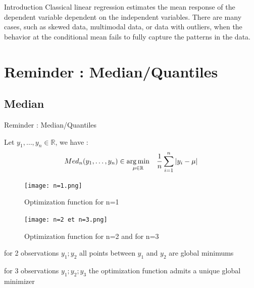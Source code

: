 \documentclass[unknownkeysallowed]{beamer}
\begin{document}
\begin{frame}{Introduction}
\vspace{0.2cm}
Classical linear regression estimates the mean response of the dependent variable dependent on the independent variables. There are many cases, such as skewed data, multimodal data, or data with outliers, when the behavior at the conditional mean fails to fully capture the patterns in the data.
\vspace{0.2cm}
\\
\end{frame}




\section{Reminder : Median/Quantiles}
\label{sec:Reminder : Median/Quantiles}
\subsection{Median}
\label{sub:Median}

\begin{frame}{Reminder : Median/Quantiles}

\vspace{0.4cm}

{
Let $y_1, \dots , y_n \in \mathbb{R} $, we have :
$$Med_{n}(y_1,\dots,y_n)\in \underset{ \mu \in \mathbb{R}} {\operatorname*{arg\,min}} \quad \frac{1}{n} \sum_{i=1}^n |y_i-\mu|$$
}

\vspace{0.25cm}


\begin{figure}[H]
    \centering
    \texttt{[image: n=1.png]}
    \caption{Optimization function for n=1}
    \label{fig}
\end{figure}

\end{frame}




\begin{frame}
\begin{figure}[H]
    \centering
    \texttt{[image: n=2 et n=3.png]}
    \caption{Optimization function for n=2 and for n=3}
    \label{fig}
\end{figure}

for 2 observations $y_1; y_2$ all points between $y_1$ and $y_2$ are global minimums

for 3 observations $y_1; y_2; y_3$ the optimization function admits a unique global minimizer

\end{frame}
\end{document}
